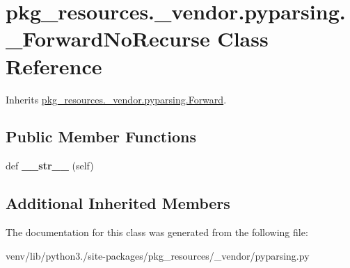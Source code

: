 \hypertarget{classpkg__resources_1_1__vendor_1_1pyparsing_1_1___forward_no_recurse}{}\section{pkg\+\_\+resources.\+\_\+vendor.\+pyparsing.\+\_\+\+Forward\+No\+Recurse Class Reference}
\label{classpkg__resources_1_1__vendor_1_1pyparsing_1_1___forward_no_recurse}


Inherits \hyperlink{classpkg__resources_1_1__vendor_1_1pyparsing_1_1_forward}{pkg\+\_\+resources.\+\_\+vendor.\+pyparsing.\+Forward}.

\subsection*{Public Member Functions}
\begin{DoxyCompactItemize}
\item 
\mbox{\label{classpkg__resources_1_1__vendor_1_1pyparsing_1_1___forward_no_recurse_a8fea61e8e795e5fb05d493450b1e4c6f}} 
def {\bfseries \+\_\+\+\_\+str\+\_\+\+\_\+} (self)
\end{DoxyCompactItemize}
\subsection*{Additional Inherited Members}


The documentation for this class was generated from the following file\+:\begin{DoxyCompactItemize}
\item 
venv/lib/python3./site-\/packages/pkg\+\_\+resources/\+\_\+vendor/pyparsing.\+py\end{DoxyCompactItemize}

